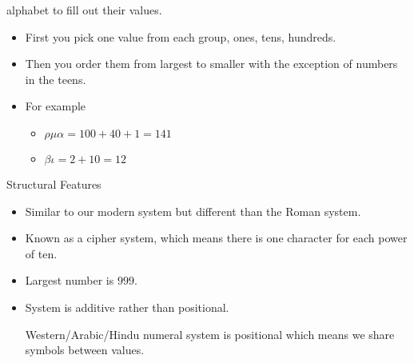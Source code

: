 \documentclass{report}
\begin{document}
\begin{description}
\begin{mdframed}
            alphabet to fill out their values.
            \begin{itemize}
                \item First you pick one value from each
                    group, ones, tens, hundreds.
                \item Then you order them from largest to
                    smaller with the exception of numbers
                    in the teens.
                \item For example
                    \begin{itemize}
                        \item $\rho \mu \alpha = 100 + 40 + 1 = 141$
                        \item $\beta \iota = 2 + 10 = 12$
                    \end{itemize}
            \end{itemize}

            Structural Features
            \begin{itemize}
                \item Similar to our modern system but different
                    than the Roman system.
                \item Known as a cipher system, which means
                    there is one character for each power
                    of ten.
                \item Largest number is $999$.
                \item System is additive rather than
                    positional.
                    \begin{mdframed}
                        Western/Arabic/Hindu numeral system is positional which
                        means we share symbols between values.
                    \end{mdframed}
            \end{itemize}


\end{mdframed}
\end{description}
\end{document}
